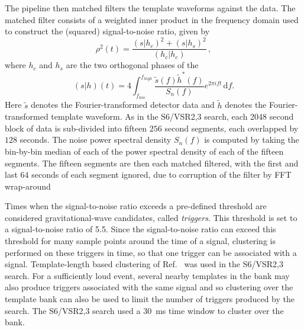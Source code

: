 The pipeline then matched filters the template waveforms against the data.
The matched filter consists of a weighted inner product in the frequency
domain used to construct the (squared) signal-to-noise ratio, given by
%
\begin{equation}
\rho^2(t) = \frac{(s|h_c)^2 + (s|h_s)^2}{(h_c|h_c)} \, ,
\label{eq:snr}
\end{equation}
%
where $h_c$ and $h_s$ are the two orthogonal phases of the 
%
\begin{equation}
(s|h)(t) = 4\int_{f_{low}}^{f_{high}} \frac{\tilde{s}(f)\tilde{h}^*(f)}{S_n (f)}e^{2\pi i f t}\, \mathrm{d}f.
\label{eq:ip}
\end{equation}
%
Here $\tilde{s}$ denotes the Fourier-transformed detector data and $\tilde{h}$
denotes the Fourier-transformed template waveform. As in the S6/VSR2,3 search,
each 2048 second block of data is sub-divided into fifteen $256$ second
segments, each overlapped by $128$ seconds. The noise power spectral
density $S_n(f)$ is computed by taking the bin-by-bin median of each of the power
spectral density of each of the fifteen segments. The fifteen segments are then each
matched filtered, with the first and last $64$ seconds of each segment
ignored, due to corruption of the filter by FFT
wrap-around~\cite{Allen:2005fk}

Times when the signal-to-noise ratio exceeds a pre-defined threshold are
considered gravitational-wave candidates, called
\emph{triggers}\cite{Allen:2005fk}. This threshold is set to a
signal-to-noise ratio of 5.5.  Since the signal-to-noise ratio can exceed
this threshold for many sample points around the time of a signal, clustering
is performed on these triggers in time, so that one trigger can be associated
with a signal. Template-length based clustering of 
Ref.~\cite{Allen:2005fk} was used in the S6/VSR2,3 search. 
For a sufficiently loud event, several nearby templates in the
bank may also produce triggers associated with the same signal and so
clustering over the template bank can also be used to limit the number of
triggers produced by the search. The S6/VSR2,3 search used a 30~ms time window
to cluster over the bank.

